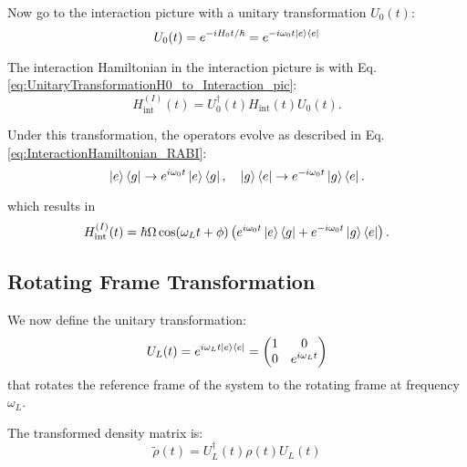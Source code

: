 Now go to the interaction picture with a unitary transformation \( U_0(t) \):
\begin{equation}
	U_0(t) = e^{-i H_0 t / \hbar} = e^{-i \omega_0 t \ket{e}\bra{e}}
	\label{eq:UnitaryTransformationH0_to_Interaction_pic}
\end{equation}

The interaction Hamiltonian in the interaction picture is with Eq. \eqref{eq:UnitaryTransformationH0_to_Interaction_pic}:
\begin{equation}
	H_{\text{int}}^{(I)}(t) = U_0^\dagger(t) H_{\text{int}}(t) U_0(t).
	\label{eq:InteractionHamiltonianInteractionPicture}
\end{equation}

Under this transformation, the operators evolve as described in Eq. \eqref{eq:InteractionHamiltonian_RABI}:
\begin{equation}
	\ket{e}\bra{g} \rightarrow e^{i\omega_0 t} \ket{e}\bra{g}, \quad
	\ket{g}\bra{e} \rightarrow e^{-i\omega_0 t} \ket{g}\bra{e}.
	\label{eq:OperatorEvolution}
\end{equation}

which results in
\begin{equation}
	H_{\text{int}}^{(I)}(t) = \hbar\Omega \cos(\omega_L t + \phi)\left(e^{i\omega_0 t} \ket{e}\bra{g} + e^{-i\omega_0 t} \ket{g}\bra{e} \right).
	\label{eq:InteractionHamiltonianTransformed}
\end{equation}

\subsection*{Rotating Frame Transformation}

We now define the unitary transformation:
\begin{equation}
	U_L(t) = e^{i \omega_L t \ket{e}\bra{e}} =
	\begin{pmatrix}
		1 & 0             \\
		0 & e^{i\omega_L t}
	\end{pmatrix}
	\label{eq:UnitaryTransformation}
\end{equation}
that rotates the reference frame of the system to the rotating frame at frequency \(\omega_L\).

The transformed density matrix is:
\begin{equation}
	\tilde{\rho}(t) = U_L^\dagger(t) \rho(t) U_L(t)
	\label{eq:TransformedDensityMatrix}
\end{equation}

